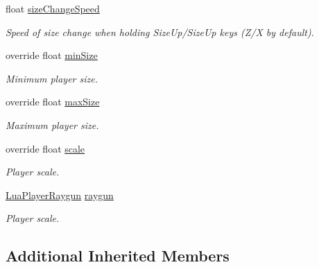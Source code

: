 \begin{DoxyCompactItemize}
float \mbox{\hyperlink{class_lua_1_1_player_entity_a3406666c706b2b01b854bada1a04da5b}{size\+Change\+Speed}}
\begin{DoxyCompactList}\small\item\em Speed of size change when holding {\ttfamily Size\+Up}/{\ttfamily Size\+Up} keys ({\ttfamily Z}/{\ttfamily X} by default). \end{DoxyCompactList}\item 
override float \mbox{\hyperlink{class_lua_1_1_player_entity_af2e34e02994fcfdb032932e9da17e49d}{min\+Size}}
\begin{DoxyCompactList}\small\item\em Minimum player size. \end{DoxyCompactList}\item 
override float \mbox{\hyperlink{class_lua_1_1_player_entity_a7ac787ce4c39f28cc36cb8b08c9934b7}{max\+Size}}
\begin{DoxyCompactList}\small\item\em Maximum player size. \end{DoxyCompactList}\item 
override float \mbox{\hyperlink{class_lua_1_1_player_entity_a853ddbac1d9d5d71d593d8e3aa9ceb0c}{scale}}
\begin{DoxyCompactList}\small\item\em Player scale. \end{DoxyCompactList}\item 
\mbox{\hyperlink{class_lua_1_1_lua_player_raygun}{Lua\+Player\+Raygun}} \mbox{\hyperlink{class_lua_1_1_player_entity_a47bfb3f0f7b06c235a1b516967d52408}{raygun}}
\begin{DoxyCompactList}\small\item\em Player scale. \end{DoxyCompactList}\end{DoxyCompactItemize}
\subsection*{Additional Inherited Members}


